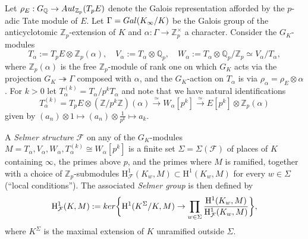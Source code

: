 \documentclass[10pt,reqno]{amsart}
\numberwithin{equation}{section}
\theoremstyle{plain}
\theoremstyle{definition}
\theoremstyle{definition}
\theoremstyle{plain}
\theoremstyle{plain}
\theoremstyle{plain}
\theoremstyle{plain}
\theoremstyle{plain}
\theoremstyle{plain}
\newcommand{\Z}{\mathbb{Z}}
\newcommand{\Q}{\mathbb{Q}}
\newcommand{\Zp}{\mathbb{Z}_{p}}
\newcommand{\Fcal}{\mathcal{F}}
\newcommand{\rank}{\mathrm{rank}}
\newcommand{\fm}{\mathfrak{m}}
\newcommand{\rH}{\mathrm{H}}
\begin{document}
Let $\rho_E:G_{\Q}\rightarrow{\rm Aut}_{\Z_p}(T_pE)$ denote the Galois representation afforded by the $p$-adic Tate module of $E$. 
Let $\Gamma={\rm Gal}(K_\infty/K)$ be the Galois group of the anticyclotomic $\Z_p$-extension of $K$ and $\alpha:\Gamma\rightarrow\Z_p^\times$ a character. %
Consider the $G_K$-modules
\begin{equation}
T_\alpha:=T_pE\otimes_{}\Z_p(\alpha),\quad
V_\alpha:=T_\alpha\otimes_{}\Q_p,\quad W_\alpha:=T_\alpha\otimes_{}\Q_p/\Z_p\simeq V_\alpha/T_\alpha,\nonumber
\end{equation}
where $\Z_p(\alpha)$ is the free $\Z_p$-module of rank one on which $G_K$ acts via the projection $G_K\twoheadrightarrow\Gamma$ composed with $\alpha$, and the $G_K$-action on $T_\alpha$ is via $\rho_\alpha = \rho_E\otimes\alpha$. 
For $k>0$ let $T_\alpha^{(k)} = T_\alpha/p^kT_\alpha$ and note that we have natural identifications
\[
T_\alpha^{(k)}=T_pE\otimes(\Z/p^k\Z)(\alpha)\xrightarrow{\simeq}W_\alpha[p^k]\xrightarrow{\simeq}E[p^k]\otimes\Z_p(\alpha)
\]
given by $(a_n)\otimes 1\mapsto(a_n)\otimes\frac{1}{p^k}\mapsto a_k$. 


A \emph{Selmer structure} $\mathcal{F}$ on any of the $G_K$-modules $M=T_{\alpha}, V_\alpha, W_\alpha, T_\alpha^{(k)}\cong W_\alpha[p^k]$ is a finite set $\Sigma=\Sigma(\mathcal{F})$ of places of $K$ containing $\infty$, the primes above $p$, and the primes where $M$ is ramified, together with a choice of $\Zp$-submodules  $\rH^1_{\Fcal}(K_w,M)\subset\rH^1(K_w,M)$ for every $w\in\Sigma$ (``local conditions''). The associated \emph{Selmer group} is then defined by
\[
\rH^1_{\Fcal}(K,M):={\rm ker}\biggl\{\rH^1(K^\Sigma/K,M)\rightarrow\prod_{w\in\Sigma}\frac{\rH^1(K_w,M)}{\rH^1_{\Fcal}(K_w,M)}\biggr\},
\]
where $K^\Sigma$ is the maximal extension of $K$ unramified outside $\Sigma$. 
\end{document}
